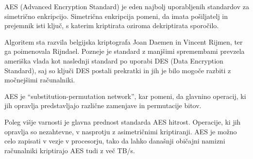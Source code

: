 AES (Advanced Encryption Standard) je eden najbolj uporabljenih standardov za simetrično enkripcijo. Simetrična enkripcija pomeni, da imata pošiljatelj in prejemnik isti ključ, s katerim kriptirata oziroma dekriptirata sporočilo.

Algoritem sta razvila belgijska kriptografa Joan Daemen in Vincent Rijmen, ter ga poimenovala Rijndael. Pozneje je standard z manjšimi spremembami prevzela ameriška vlada kot naslednji standard po uporabi DES (Data Encryption Standard), saj so ključi DES postali prekratki in jih je bilo mogoče razbiti z močnejšimi računalniki.

AES je ``substitution-permutation network'', kar pomeni, da glavnino operacij, ki jih opravlja predstavljajo različne zamenjave in permutacije bitov.

Poleg višje varnosti je glavna prednost standarda AES hitrost. Operacije, ki jih opravlja so nezahtevne, v nasprotju z asimetričnimi kriptiranji. AES je možno celo zapisati v vezje v procesorju, tako da lahko današnji običajni namizni računalniki kriptirajo AES tudi z več TB/s.

